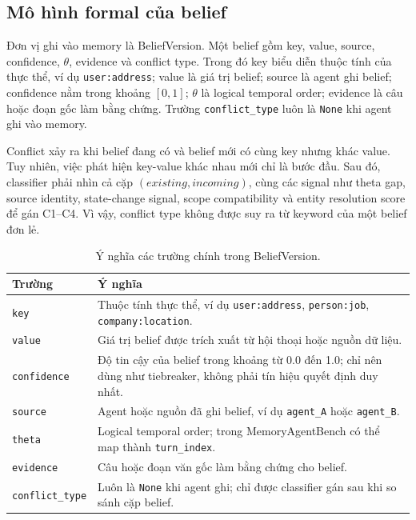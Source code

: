 \documentclass[12pt,a4paper]{article}
\newcommand{\code}[1]{\texttt{#1}}
\begin{document}
\subsection{Mô hình formal của belief}

Đơn vị ghi vào memory là BeliefVersion. Một belief gồm key, value, source, confidence, \(\theta\), evidence và conflict type. Trong đó key biểu diễn thuộc tính của thực thể, ví dụ \code{user:address}; value là giá trị belief; source là agent ghi belief; confidence nằm trong khoảng \([0,1]\); \(\theta\) là logical temporal order; evidence là câu hoặc đoạn gốc làm bằng chứng. Trường \code{conflict\_type} luôn là \code{None} khi agent ghi vào memory.

Conflict xảy ra khi belief đang có và belief mới có cùng key nhưng khác value. Tuy nhiên, việc phát hiện key-value khác nhau mới chỉ là bước đầu. Sau đó, classifier phải nhìn cả cặp \((existing, incoming)\), cùng các signal như theta gap, source identity, state-change signal, scope compatibility và entity resolution score để gán C1--C4. Vì vậy, conflict type không được suy ra từ keyword của một belief đơn lẻ.

\begin{table}[H]
\centering
\caption{Ý nghĩa các trường chính trong BeliefVersion.}
\label{tab:belief-fields}
\begin{tabular}{p{}p{}}
\toprule
\textbf{Trường} & \textbf{Ý nghĩa} \\
\midrule
\code{key} & Thuộc tính thực thể, ví dụ \code{user:address}, \code{person:job}, \code{company:location}. \\
\code{value} & Giá trị belief được trích xuất từ hội thoại hoặc nguồn dữ liệu. \\
\code{confidence} & Độ tin cậy của belief trong khoảng từ 0.0 đến 1.0; chỉ nên dùng như tiebreaker, không phải tín hiệu quyết định duy nhất. \\
\code{source} & Agent hoặc nguồn đã ghi belief, ví dụ \code{agent\_A} hoặc \code{agent\_B}. \\
\code{theta} & Logical temporal order; trong MemoryAgentBench có thể map thành \code{turn\_index}. \\
\code{evidence} & Câu hoặc đoạn văn gốc làm bằng chứng cho belief. \\
\code{conflict\_type} & Luôn là \code{None} khi agent ghi; chỉ được classifier gán sau khi so sánh cặp belief. \\
\bottomrule
\end{tabular}
\end{table}
\end{document}
